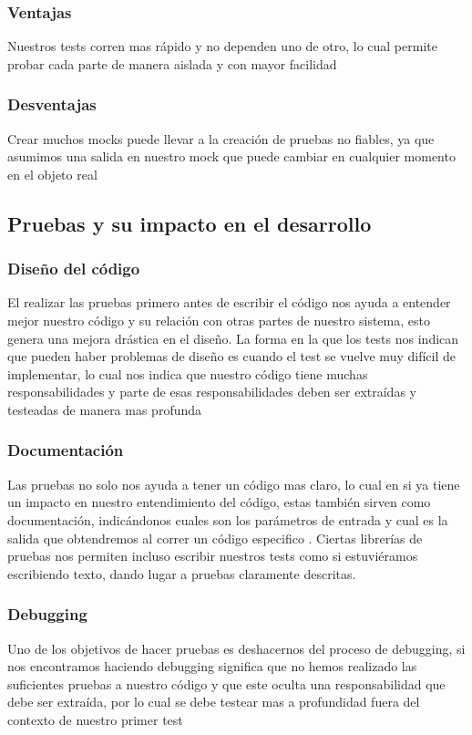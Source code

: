 \subsubsection{Ventajas}
Nuestros tests corren mas rápido y no dependen uno de otro, lo cual permite
probar cada parte de manera aislada y con mayor facilidad

\subsubsection{Desventajas}
Crear muchos mocks puede llevar a la creación de pruebas no fiables, ya que
asumimos una salida en nuestro mock que puede cambiar en cualquier momento en
el objeto real

\subsection{Pruebas y su impacto en el desarrollo}

\subsubsection{Diseño del código}
El realizar las pruebas primero antes de escribir el código nos ayuda a
entender mejor nuestro código y su relación con otras partes de nuestro
sistema, esto genera una mejora drástica en el diseño. La forma en la que los
tests nos indican que pueden haber problemas de diseño es cuando el test se
vuelve muy difícil de implementar, lo cual nos indica que nuestro código tiene
muchas responsabilidades y parte de esas responsabilidades deben ser extraídas
y testeadas de manera mas profunda

\subsubsection{Documentación}
Las pruebas no solo nos ayuda a tener un código mas claro, lo cual en si ya
tiene un impacto en nuestro entendimiento del código, estas también sirven como
documentación, indicándonos cuales son los parámetros de entrada y cual es la
salida que obtendremos al correr un código especifico . Ciertas librerías de
pruebas nos permiten incluso escribir nuestros tests como si estuviéramos
escribiendo texto, dando lugar a pruebas claramente descritas.

\subsubsection{Debugging}
Uno de los objetivos de hacer pruebas es deshacernos
del proceso de debugging, si nos encontramos haciendo debugging significa que
no hemos realizado las suficientes pruebas a nuestro código y que este oculta
una responsabilidad que debe ser extraída, por lo cual se debe testear mas a
profundidad fuera del contexto de nuestro primer test

